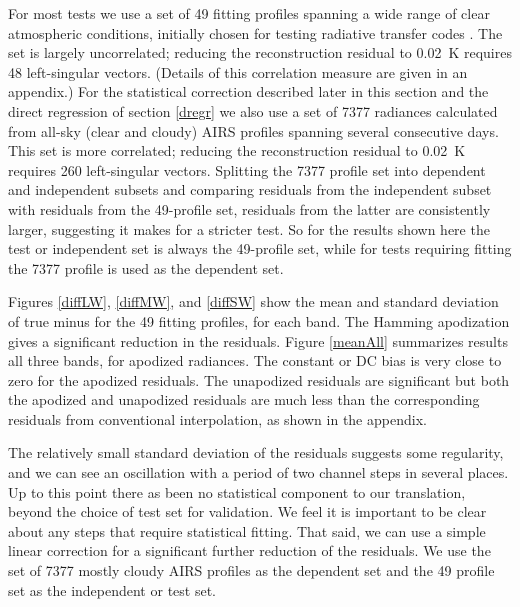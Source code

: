 \documentclass[10pt,twocolumn]{article}
\begin{document}
For most tests we use a set of 49 fitting profiles spanning a wide
range of clear atmospheric conditions, initially chosen for testing
radiative transfer codes \cite{sarta1,sarta2}.  The set is largely
uncorrelated; reducing the reconstruction residual to 0.02~K
requires 48 left-singular vectors.  (Details of this correlation
measure are given in an appendix.)  For the statistical correction
described later in this section and the direct regression of section
\ref{dregr} we also use a set of 7377 radiances calculated from
all-sky (clear and cloudy) AIRS profiles spanning several
consecutive days.  This set is more correlated; reducing the
reconstruction residual to 0.02~K requires 260 left-singular
vectors.  Splitting the 7377 profile set into dependent and
independent subsets and comparing residuals from the independent
subset with residuals from the 49-profile set, residuals from the
latter are consistently larger, suggesting it makes for a stricter
test.  So for the results shown here the test or independent set is
always the 49-profile set, while for tests requiring fitting the
7377 profile is used as the dependent set.

Figures \ref{diffLW}, \ref{diffMW}, and \ref{diffSW} show the mean
and standard deviation of true {\cris} minus {\airs} {\cris} for the
49 fitting profiles, for each {\cris} band.  The Hamming apodization
gives a significant reduction in the residuals.  Figure \ref{meanAll}
summarizes results all three bands, for apodized radiances.  The
constant or DC bias is very close to zero for the apodized residuals.
The unapodized residuals are significant but both the apodized and
unapodized residuals are much less than the corresponding residuals
from conventional interpolation, as shown in the appendix.



The relatively small standard deviation of the residuals suggests
some regularity, and we can see an oscillation with a period of two
channel steps in several places.  Up to this point there as been no
statistical component to our translation, beyond the choice of test
set for validation.  We feel it is important to be clear about any
steps that require statistical fitting.  That said, we can use a
simple linear correction for a significant further reduction of the
residuals.  We use the set of 7377 mostly cloudy AIRS profiles as
the dependent set and the 49 profile set as the independent or test
set.
\end{document}
